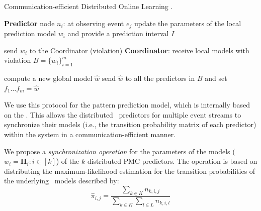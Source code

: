 \begin{algorithm}[h]
	\caption{Communication-efficient Distributed Online Learning \cite{kamp2014communication}.} 
	\begin{algorithmic}[1] 
	
		\Statex \Indm  \textbf{Predictor} node $n_i$: at observing event $e_j$
		\Statex \Indp update the parameters of the local prediction model $w_i$ and provide a prediction interval $I$ \; 

		\Statex {}  
		\Statex send  $w_i$ to the Coordinator (violation) \;
		\Statex \Indm \textbf{Coordinator}:
		\Statex \Indp receive local models with violation 
		 $B=\{w_i\}_{i=1}^m$ \;
	
	
		\Statex {}
        \Statex
		\Statex compute a new global model $\hat{w}$ \;
		\Statex send $\hat{w}$ to all the predictors in $B$ and set $f_{1}\dots f_{m}=\hat{w} $\; 
		\Statex {}
	
	\end{algorithmic}
	\label{algonline:dol}
\end{algorithm}


\par  We use this protocol for the pattern prediction model, which is internally based on the \pmcmr. This allows the distributed \pmcmr\ predictors for multiple event streams to  synchronize their models (i.e., the transition probability matrix of each predictor) within the system in a communication-efficient manner. 



\par We propose a \textit{synchronization operation} for the parameters of the models ($w_i=\boldsymbol{\Pi}_i :i \in[k]$) of the $k$ distributed PMC predictors. The operation is based on distributing the maximum-likelihood estimation \cite{anderson1957statistical} for the transition probabilities of the underlying \pmcmr\ models described by: 
\begin{equation}
\label{eq:dis_pi_estim}
\hat{\pi}_{i,j}=\frac{\sum_{k \in K} n_{k,i,j}}{\sum_{k \in K} \sum_{l \in L} n_{k,i,l}}
\end{equation}

